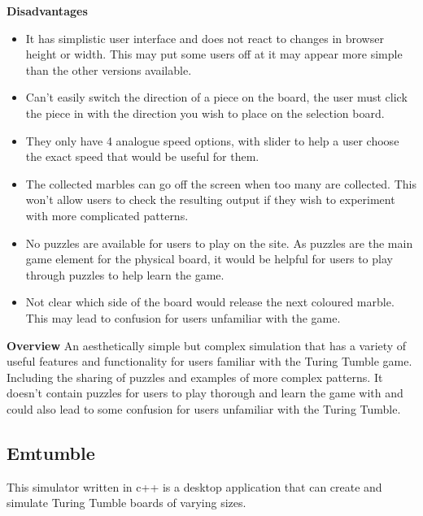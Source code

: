 \documentclass{l4proj}
\begin{document}
\textbf{Disadvantages}
\begin{itemize}
    \item It has simplistic user interface and does not react to changes in browser height or width. This may put some users off at it may appear more simple than the other versions available.
    \item Can't easily switch the direction of a piece on the board, the user must click the piece in with the direction you wish to place on the selection board.
    \item They only have 4 analogue speed options, with slider to help a user choose the exact speed that would be useful for them.
    \item The collected marbles can go off the screen when too many are collected. This won't allow users to check the resulting output if they wish to experiment with more complicated patterns.
    \item No puzzles are available for users to play on the site. As puzzles are the main game element for the physical board, it would be helpful for users to play through puzzles to help learn the game.
    \item Not clear which side of the board would release the next coloured marble. This may lead to confusion for users unfamiliar with the game.
\end{itemize}

\textbf{Overview}
An aesthetically simple but complex simulation that has a variety of useful features and functionality for users familiar with the Turing Tumble game. Including the sharing of puzzles and examples of more complex patterns. It doesn't contain puzzles for users to play thorough and learn the game with and could also lead to some confusion for users unfamiliar with the Turing Tumble.

\subsection{Emtumble}
This simulator written in c++ is a desktop application that can create and simulate Turing Tumble boards of varying sizes.
\end{document}
